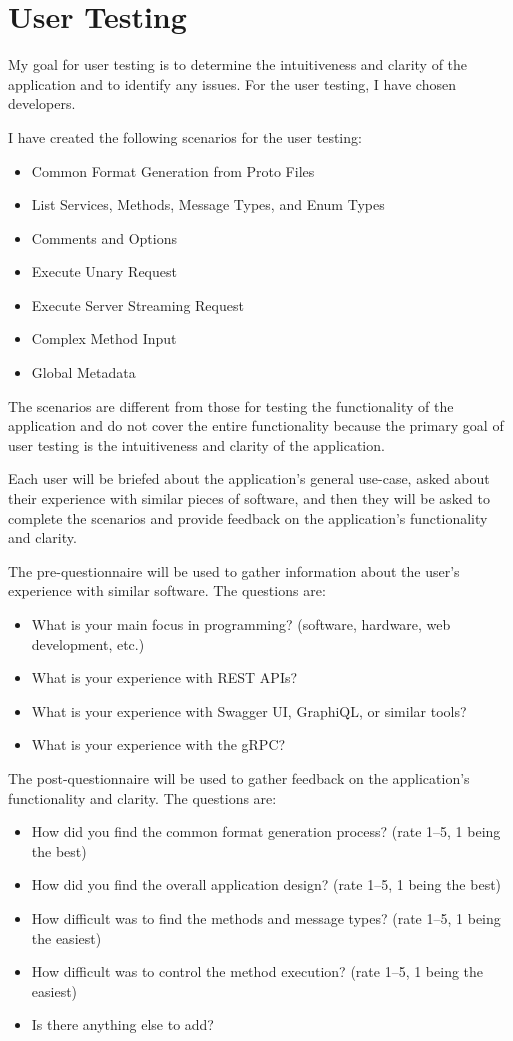 \section{User Testing}
My goal for user testing is to determine the intuitiveness and clarity of the application and to identify any issues.
For the user testing, I have chosen developers.

I have created the following scenarios for the user testing:
\begin{itemize}
    \item Common Format Generation from Proto Files
    \item List Services, Methods, Message Types, and Enum Types
    \item Comments and Options
    \item Execute Unary Request
    \item Execute Server Streaming Request
    \item Complex Method Input
    \item Global Metadata
\end{itemize}

The scenarios are different from those for testing the functionality of the application
and do not cover the entire functionality
because the primary goal of user testing is the intuitiveness and clarity of the application.

Each user will be briefed about the application's general use-case,
asked about their experience with similar pieces of software,
and then they will be asked to complete the scenarios
and provide feedback on the application's functionality and clarity.

The pre-questionnaire will be used to gather information about the user's experience with similar software.
The questions are:
\begin{itemize}
    \item What is your main focus in programming?
    (software, hardware, web development, etc.)
    \item What is your experience with REST APIs?
    \item What is your experience with Swagger UI, GraphiQL, or similar tools?
    \item What is your experience with the gRPC?
\end{itemize}

The post-questionnaire will be used to gather feedback on the application's functionality and clarity.
The questions are:
\begin{itemize}
    \item How did you find the common format generation process?
    (rate 1--5, 1 being the best)
    \item How did you find the overall application design?
    (rate 1--5, 1 being the best)
    \item How difficult was to find the methods and message types?
    (rate 1--5, 1 being the easiest)
    \item How difficult was to control the method execution?
    (rate 1--5, 1 being the easiest)
    \item Is there anything else to add?
\end{itemize}

